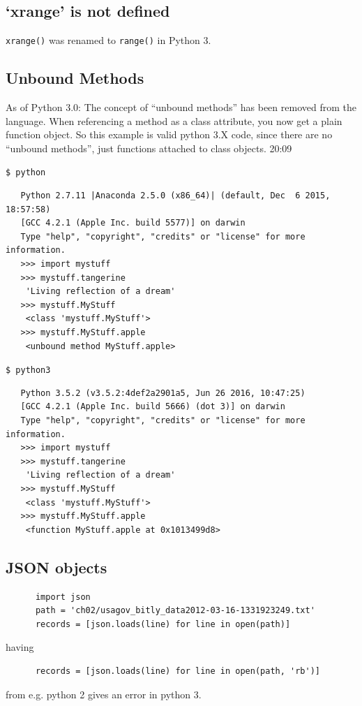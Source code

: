\documentclass[11pt,a4paper]{article}
\begin{document}
    \subsection{`xrange' is not defined}
    {\tt xrange()} was renamed to {\tt range()} in Python 3.


     \subsection{Unbound Methods}
     As of Python 3.0: The concept of ``unbound methods'' has been
removed from the language. When referencing a method as a class
attribute, you now get a plain function object. So this example is
valid python 3.X code, since there are no ``unbound methods'', just
functions attached to class objects.  %
20:09

     {\tt \$ python}
    \begin{lstlisting}
   Python 2.7.11 |Anaconda 2.5.0 (x86_64)| (default, Dec  6 2015, 18:57:58) 
   [GCC 4.2.1 (Apple Inc. build 5577)] on darwin
   Type "help", "copyright", "credits" or "license" for more information.
   >>> import mystuff
   >>> mystuff.tangerine
    'Living reflection of a dream'
   >>> mystuff.MyStuff
    <class 'mystuff.MyStuff'>
   >>> mystuff.MyStuff.apple
    <unbound method MyStuff.apple>
     \end{lstlisting}

     {\tt \$ python3}
    \begin{lstlisting}
   Python 3.5.2 (v3.5.2:4def2a2901a5, Jun 26 2016, 10:47:25) 
   [GCC 4.2.1 (Apple Inc. build 5666) (dot 3)] on darwin
   Type "help", "copyright", "credits" or "license" for more information.
   >>> import mystuff
   >>> mystuff.tangerine
    'Living reflection of a dream'
   >>> mystuff.MyStuff
    <class 'mystuff.MyStuff'>
   >>> mystuff.MyStuff.apple
    <function MyStuff.apple at 0x1013499d8>
    \end{lstlisting}

    \subsection{JSON objects}
    \begin{lstlisting}
      import json
      path = 'ch02/usagov_bitly_data2012-03-16-1331923249.txt'
      records = [json.loads(line) for line in open(path)]
    \end{lstlisting}
    having
    \begin{lstlisting}
      records = [json.loads(line) for line in open(path, 'rb')]
      \end{lstlisting}
      from e.g. python 2 gives an error in python 3. 
\end{document}
